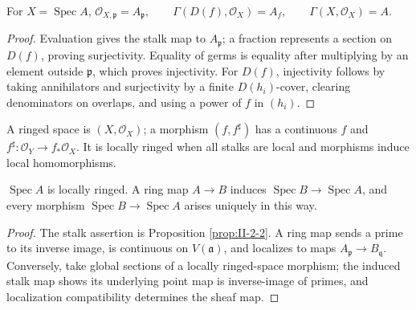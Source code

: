 \begin{proposition}
\label{prop:II-2-2}
\leanok
For $X=\operatorname{Spec}A$,
$\mathcal O_{X,\mathfrak p}=A_{\mathfrak p},\qquad
\Gamma(D(f),\mathcal O_X)=A_f,\qquad\Gamma(X,\mathcal O_X)=A$.
\end{proposition}
\begin{proof}
Evaluation gives the stalk map to $A_{\mathfrak p}$; a fraction represents a section on $D(f)$, proving
surjectivity. Equality of germs is equality after multiplying by an element outside $\mathfrak p$,
which proves injectivity. For $D(f)$, injectivity follows by taking annihilators and surjectivity by a
finite $D(h_i)$-cover, clearing denominators on overlaps, and using a power of $f$ in $(h_i)$.
\end{proof}

\begin{definition}
\label{def:II-2-ringed}
A ringed space is $(X,\mathcal O_X)$; a morphism $(f,f^\sharp)$ has a continuous $f$ and
$f^\sharp:\mathcal O_Y\to f_*\mathcal O_X$. It is locally ringed when all stalks are local and
morphisms induce local homomorphisms.
\end{definition}

\begin{proposition}
\label{prop:II-2-3}
\leanok
$\operatorname{Spec}A$ is locally ringed. A ring map $A\to B$ induces
$\operatorname{Spec}B\to\operatorname{Spec}A$, and every morphism
$\operatorname{Spec}B\to\operatorname{Spec}A$ arises uniquely in this way.
\end{proposition}
\begin{proof}
The stalk assertion is Proposition \ref{prop:II-2-2}. A ring map sends a prime to its inverse image,
is continuous on $V(\mathfrak a)$, and localizes to maps $A_{\mathfrak p}\to B_{\mathfrak q}$. Conversely,
take global sections of a locally ringed-space morphism; the induced stalk map shows its underlying
point map is inverse-image of primes, and localization compatibility determines the sheaf map.
\end{proof}

